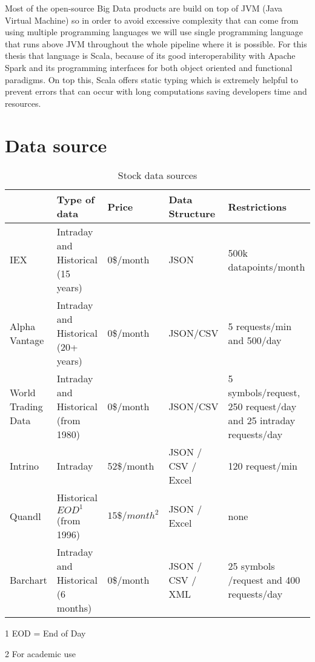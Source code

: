 Most of the open-source Big Data products are build on top of JVM (Java Virtual Machine) so in order to avoid excessive complexity that can come from using multiple programming languages we will use single programming language that runs above JVM throughout the whole pipeline where it is possible.
For this thesis that language is Scala, because of its good interoperability with Apache Spark and its programming interfaces for both object oriented and functional paradigms.
On top this, Scala offers static typing which is extremely helpful to prevent errors that can occur with long computations saving developers time and resources. \cite{scalabook}

\section{Data source}

\begin{table}[! htbp]\centering 
    \caption{Stock data sources}
    \begin{threeparttable}
        \begin{tabular}{|p{2cm}|p{2.5cm}|l|p{2cm}|p{3cm}|} 
        \hline
        & Type of data & Price & Data Structure & Restrictions \\ \hline
        IEX \cite{iex}& Intraday and Historical (15 years) & 0\$/month & JSON & 500k datapoints/month \\ \hline
        Alpha Vantage \cite{alphavantage}  & Intraday and Historical (20+ years)& 0\$/month & JSON/CSV & 5 requests/min and 500/day\\ \hline
        World Trading Data \cite{worldtradingdata} & Intraday and Historical (from 1980) & 0\$/month & JSON/CSV & 5 symbols/request, 250 request/day and 25 intraday requests/day\\ \hline
        Intrino \cite{intrino} & Intraday & 52\$/month & JSON / CSV / Excel & 120 request/min\\ \hline
        Quandl \cite{quandl} & Historical $EOD^1$ (from 1996) & $15\$/month^2$ & JSON / Excel & none\\ \hline
        Barchart \cite{barchart} & Intraday and Historical (6 months) & 0\$/month & JSON / CSV / XML & 25 symbols /request and 400 requests/day\\
        \hline
        \end{tabular}
        \begin{tablenotes}\footnotesize
            \item[1] EOD = End of Day
            \item[2] For academic use 
        \end{tablenotes}
    \end{threeparttable}        
\end{table}

